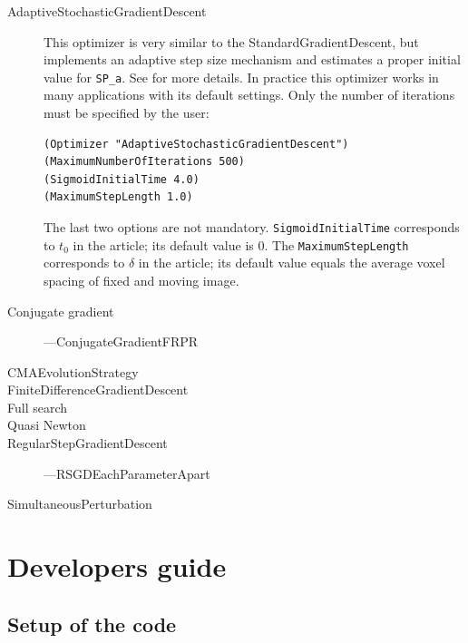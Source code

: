 \documentclass[]{report}
\begin{document}
\begin{description}
\item[AdaptiveStochasticGradientDescent] This optimizer is very similar to
    the StandardGradientDescent, but implements an adaptive step size
    mechanism and estimates a proper initial value for \texttt{SP\_a}. See
    \cite{Klein09} for more details. In practice this optimizer works in
    many applications with its default settings. Only the number of
    iterations must be specified by the user:
\begin{verbatim}
(Optimizer "AdaptiveStochasticGradientDescent")
(MaximumNumberOfIterations 500)
(SigmoidInitialTime 4.0)
(MaximumStepLength 1.0)
\end{verbatim}
The last two options are not mandatory. \texttt{SigmoidInitialTime}
corresponds to $t_0$ in the article; its default value is 0. The
\texttt{MaximumStepLength} corresponds to $\delta$ in the article; its
default value equals the average voxel spacing of fixed and moving image.

\item[Conjugate gradient]
---ConjugateGradientFRPR

\item[CMAEvolutionStrategy]

\item[FiniteDifferenceGradientDescent]

\item[Full search]

\item[Quasi Newton]


\item[RegularStepGradientDescent]
---RSGDEachParameterApart

\item[SimultaneousPerturbation]
\end{description}



\chapter{Developers guide}\label{chp:develop}

%
\section{Setup of the code}
\end{document}

